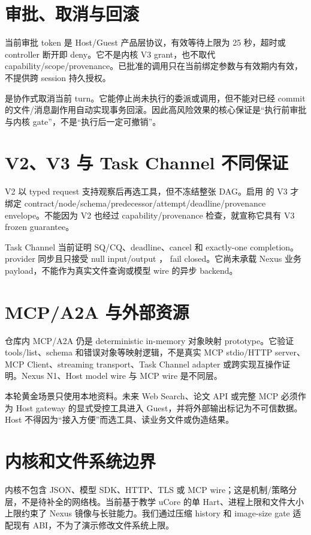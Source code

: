 \section{审批、取消与回滚}

当前审批 token 是 Host/Guest 产品层协议，有效等待上限为 25 秒，超时或 controller 断开即 deny。它不是内核 V3 grant，也不取代 capability/scope/provenance。已批准的调用只在当前绑定参数与有效期内有效，不提供跨 session 持久授权。

 是协作式取消当前 turn。它能停止尚未执行的委派或调用，但不能对已经 commit 的文件/消息副作用自动实现事务回滚。因此高风险效果的核心保证是“执行前审批与内核 gate”，不是“执行后一定可撤销”。

\section{V2、V3 与 Task Channel 不同保证}

V2 以 typed request 支持观察后再选工具，但不冻结整张 DAG。启用  的 V3 才绑定 contract/node/schema/predecessor/attempt/deadline/provenance envelope。不能因为 V2 也经过 capability/provenance 检查，就宣称它具有 V3 frozen guarantee。

Task Channel 当前证明 SQ/CQ、deadline、cancel 和 exactly-one completion。provider 同步且只接受 null input/output ， fail closed。它尚未承载 Nexus 业务 payload，不能作为真实文件查询或模型 wire 的异步 backend。

\section{MCP/A2A 与外部资源}

仓库内 MCP/A2A 仍是 deterministic in-memory 对象映射 prototype。它验证 tools/list、schema 和错误对象等映射逻辑，不是真实 MCP stdio/HTTP server、MCP Client、streaming transport、Task Channel adapter 或跨实现互操作证明。Nexus N1、Host model wire 与 MCP wire 是不同层。

本轮黄金场景只使用本地资料。未来 Web Search、论文 API 或完整 MCP 必须作为 Host gateway 的显式受控工具进入 Guest，并将外部输出标记为不可信数据。Host 不得因为“接入方便”而选工具、读业务文件或伪造结果。

\section{内核和文件系统边界}

内核不包含 JSON、模型 SDK、HTTP、TLS 或 MCP wire；这是机制/策略分层，不是待补全的网络栈。当前基于教学 uCore 的单 Hart、进程上限和文件大小上限约束了 Nexus 镜像与长驻能力。我们通过压缩 history 和 image-size gate 适配现有 ABI，不为了演示修改文件系统上限。

